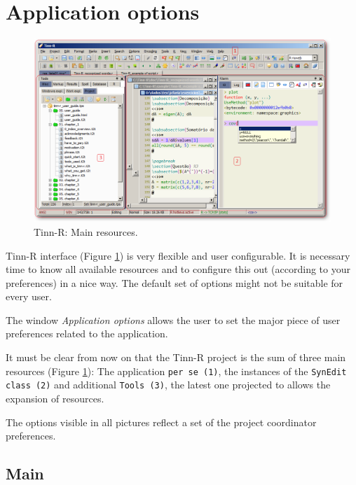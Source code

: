 
\hypertarget{working_app}{}
\section{Application options}

\begin{figure}[h!]
  \begin{center}
    \includegraphics[width=\headwidth]{./res/parts_01.png}
  \end{center}
  \caption{Tinn-R: Main resources.}
  \label{fig:tinn-r_interface}
\end{figure}

Tinn-R interface
(Figure \ref{fig:tinn-r_interface})
is very flexible and user configurable. It is necessary time
to know all available resources and to configure this out (according to your
preferences) in a nice way. The default set of options might not be suitable
for every user.

The window \textit{Application options} allows the user to set the major piece
of user preferences related to the application.

It must be clear from now on that the Tinn-R project is the sum of three main
resources (Figure \ref{fig:tinn-r_interface}):
The application \texttt{per se (1)},
the instances of the \texttt{SynEdit class (2)}
and additional \texttt{Tools (3)},
the latest one projected to allows the expansion of resources.

The options visible in all pictures reflect a set of the project coordinator
preferences.


\hypertarget{working_app_main}{}
\subsection{Main}

